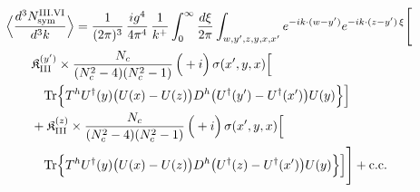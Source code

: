 \begingroup\small
\begin{align}\label{eq:S-III.VI-3}
&\Big\langle\frac{d^{3}N^{\rm III.VI}_{{\rm sym}}}{d^{3}k}\Big\rangle=\frac{1}{(2\pi)^{3}}\, \frac{ig^{4}}{4\pi^{4}}\, \frac{1}{k^{+}} \int_{0}^{\infty}\frac{d\xi}{2\pi} \int_{w,y',z,y,x,x'}e^{-ik\cdot(w-y')}e^{-ik\cdot(z-y')\,\xi}\Bigg[\notag\\
&\quad\quad \mathfrak{K}^{(y')}_{\rm III} \times \frac{N_{c}}{(N_{c}^{2}-4)(N_{c}^{2}-1)}\, \Big(+i\Big)\, \sigma(x',y,x)\Big[\notag\\
&\quad\quad\quad {\rm Tr}\Big\{T^{h}U^{\dagger}(y)\big(U(x)-U(z)\big)D^{h}\big(U^{\dagger}(y')-U^{\dagger}(x')\big)U(y)\Big\}\Big]\notag\\
&\quad\quad + \mathfrak{K}^{(z)}_{\rm III} \times \frac{N_{c}}{(N_{c}^{2}-4)(N_{c}^{2}-1)}\, \Big(+i\Big)\, \sigma(x',y,x)\Big[\notag\\
&\quad\quad\quad {\rm Tr}\Big\{T^{h}U^{\dagger}(y)\big(U(x)-U(z)\big)D^{h}\big(U^{\dagger}(z)-U^{\dagger}(x')\big)U(y)\Big\}\Big]\Bigg] +{\rm c.c.}
\end{align}
\endgroup

